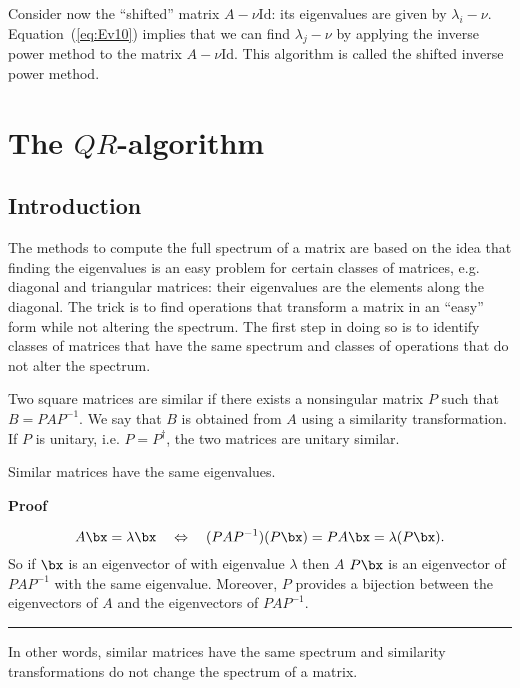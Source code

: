 Consider now the ``shifted'' matrix $A - \nu \text{Id}$: its
eigenvalues are given by $\lambda_i - \nu$.  Equation~(\ref{eq:Ev10})
implies that we can find $\lambda_j - \nu$ by applying the inverse
power method to the matrix $A - \nu \text{Id}$.  This algorithm is
called the shifted inverse power method.

\section{The \texorpdfstring{$QR$}{QR}-algorithm}

\subsection{Introduction}

The methods to compute the full spectrum of a matrix are based on the
idea that finding the eigenvalues is an easy problem for certain
classes of matrices, e.g. diagonal and triangular matrices: their
eigenvalues are the elements along the diagonal.  The trick
is to find operations that transform a matrix in an ``easy'' form
while not altering the spectrum.    The first step in doing so is to
identify classes of matrices that have the same spectrum and classes
of operations that do not alter the spectrum.

\begin{definition}
Two square matrices are similar if there exists a nonsingular matrix
$P$ such that $B = P A P^{-1}$.   We say that $B$ is obtained from $A$
using a similarity transformation.   If $P$ is unitary, i.e. $P =
P^\dagger$, the two matrices are unitary similar.
\end{definition}

\begin{theorem}
  \label{thr:1}
  Similar matrices have the same eigenvalues.
\end{theorem}
\noindent 
\textbf{Proof}

\begin{equation*}
  A \bx = \lambda \bx \quad \Leftrightarrow \quad
  (P A P^{-1}) (P \bx) = P A \bx = \lambda (P \bx).
\end{equation*}
So if $\bx$ is an eigenvector of with eigenvalue $\lambda$ then $A$ $P
\bx$ is an eigenvector of $P A P^{-1}$ with the same
eigenvalue. Moreover, $P$ provides a bijection between the
eigenvectors of $A$ and the eigenvectors of $P A P^{-1}$. \hfill
\rule{3mm}{3mm}

\noindent
In other words, similar matrices have the same spectrum and similarity
transformations do not change the spectrum of a matrix.

